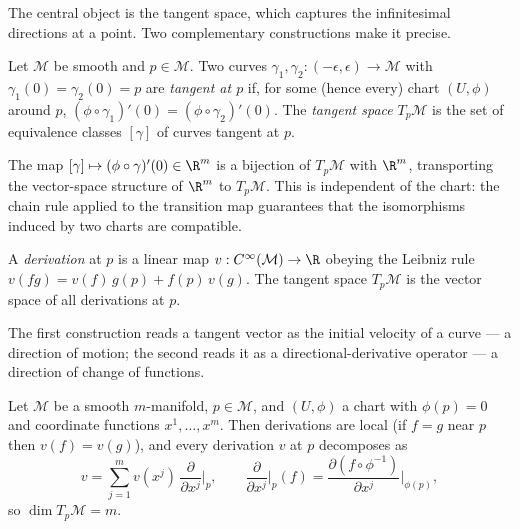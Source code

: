 The central object is the tangent space, which captures the infinitesimal
directions at a point. Two complementary constructions make it precise.

\begin{definition}
\label{def:found:tangent-curves}
Let $\mathcal{M}$ be smooth and $p \in \mathcal{M}$. Two curves
$\gamma_1, \gamma_2 : (-\epsilon,\epsilon) \to \mathcal{M}$ with
$\gamma_1(0) = \gamma_2(0) = p$ are \emph{tangent at $p$} if, for some (hence
every) chart $(U,\phi)$ around $p$, $(\phi\circ\gamma_1)'(0) =
(\phi\circ\gamma_2)'(0)$. The \emph{tangent space} $T_p\mathcal{M}$ is the set of
equivalence classes $[\gamma]$ of curves tangent at $p$.
\end{definition}

\begin{remark}
\label{rem:found:tangent-vector}
The map $[\gamma] \mapsto (\phi\circ\gamma)'(0) \in \R^m$ is a bijection of
$T_p\mathcal{M}$ with $\R^m$, transporting the vector-space structure of $\R^m$
to $T_p\mathcal{M}$. This is independent of the chart: the chain rule applied to
the transition map guarantees that the isomorphisms induced by two charts are
compatible.
\end{remark}

\begin{definition}
\label{def:found:tangent-deriv}
A \emph{derivation} at $p$ is a linear map $v : C^\infty(\mathcal{M}) \to \R$
obeying the Leibniz rule $v(fg) = v(f)\,g(p) + f(p)\,v(g)$. The tangent space
$T_p\mathcal{M}$ is the vector space of all derivations at $p$.
\end{definition}

The first construction reads a tangent vector as the initial velocity of a curve
--- a direction of motion; the second reads it as a directional-derivative
operator --- a direction of change of functions.

\begin{lemma}
\label{lem:found:derivations}
Let $\mathcal{M}$ be a smooth $m$-manifold, $p \in \mathcal{M}$, and $(U, \phi)$ a
chart with $\phi(p) = 0$ and coordinate functions $x^1, \ldots, x^m$. Then
derivations are local (if $f = g$ near $p$ then $v(f) = v(g)$), and every
derivation $v$ at $p$ decomposes as
\[
  v = \sum_{j=1}^m v(x^j)\,\frac{\partial}{\partial x^j}\Big|_p,
  \qquad \frac{\partial}{\partial x^j}\Big|_p(f) =
  \frac{\partial(f\circ\phi^{-1})}{\partial x^j}\Big|_{\phi(p)},
\]
so $\dim T_p\mathcal{M} = m$.
\end{lemma}

